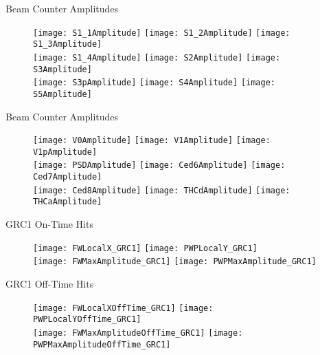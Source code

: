 \documentclass[11pt]{beamer}
\begin{document}
\begin{frame}{Beam Counter Amplitudes}
\begin{figure}
\centering
\texttt{[image: S1\_1Amplitude]} 
\texttt{[image: S1\_2Amplitude]}
\texttt{[image: S1\_3Amplitude]} \\
\texttt{[image: S1\_4Amplitude]} 
\texttt{[image: S2Amplitude]}
\texttt{[image: S3Amplitude]}  \\
\texttt{[image: S3pAmplitude]} 
\texttt{[image: S4Amplitude]} 
\texttt{[image: S5Amplitude]} 
\end{figure}                                                                                        
\end{frame} 

\begin{frame}{Beam Counter Amplitudes}
\begin{figure}
\centering
\texttt{[image: V0Amplitude]}
\texttt{[image: V1Amplitude]} 
\texttt{[image: V1pAmplitude]} \\
\texttt{[image: PSDAmplitude]} 
\texttt{[image: Ced6Amplitude]}
\texttt{[image: Ced7Amplitude]} \\ 
\texttt{[image: Ced8Amplitude]} 
\texttt{[image: THCdAmplitude]} 
\texttt{[image: THCaAmplitude]} 
\end{figure}
\end{frame}

\begin{frame}{GRC1 On-Time Hits}
\begin{figure}
\centering
\texttt{[image: FWLocalX\_GRC1]}
\texttt{[image: PWPLocalY\_GRC1]} \\
\texttt{[image: FWMaxAmplitude\_GRC1]}
\texttt{[image: PWPMaxAmplitude\_GRC1]} 
\end{figure}
\end{frame}

\begin{frame}{GRC1 Off-Time Hits}
\begin{figure}
\centering
\texttt{[image: FWLocalXOffTime\_GRC1]}
\texttt{[image: PWPLocalYOffTime\_GRC1]} \\
\texttt{[image: FWMaxAmplitudeOffTime\_GRC1]}
\texttt{[image: PWPMaxAmplitudeOffTime\_GRC1]} 
\end{figure}
\end{frame}
\end{document}
